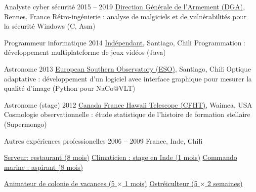 \begin{joblist}[12.8][8.4][4]

\setlength{\parskip}{0.3cm}
\vspace{-0.4cm}

\item[Analyste cyber sécurité]{2015 -- 2019}
	{
  \href{http://www.defense.gouv.fr/dga/}{Direction Générale de l'Armement (DGA)}, Rennes, France
  }
  {Rétro-ingénierie : analyse de malgiciels et de vulnérabilités pour la sécurité Windows (C, Asm)}

\item[Programmeur informatique]{2014}
	{
	\href{https://tinmarino.github.io/page/}{Indépendant}, Santiago, Chili
  }
  {Programmation : développement multiplateforme de jeux vidéos (Java)}



\item[Astronome]{2013}
	{
	\href{http://www.eso.org/public/}{European Southern Observatory (ESO)}, Santiago, Chili
	}
  {Optique adaptative : développement d'un logiciel avec interface graphique pour mesurer la qualité d'image (Python pour NaCo@VLT)}

\item[Astronome (stage)]{2012}
	{
\href{https://www.cfht.hawaii.edu/}{Canada France Hawaii Telescope (CFHT)}, Waimea, USA
  }
  {Cosmologie observationnelle : étude statistique de l'histoire de formation stellaire (Supermongo)}

\item[Autres expériences professionelles]{2006 -- 2009}
	{
	France, Inde, Chili
	}
	{
    \renewcommand\labelitemi{{}}
		\vspace{-0.8cm}
    \setlength{\parskip}{0cm}
		\begin{itemize}
		\setlength\itemsep{0cm}
    \cvitem \href{http://www.insertcoin.cl/}{ Serveur: restaurant (8 mois)}
    \cvitem \href{http://www.dupont.co.in/}{ Climaticien : stage en Inde (1 mois)}
    \cvitem \href{http://www.defense.gouv.fr/marine/organisation/forces/fusiliers-marins-et-commandos/force-maritime-des-fusiliers-marins-et-commandos}{ Commando marine : aspirant (8 mois)}

    \cvitem \href{http://www.vacances-pour-tous.org/}{ Animateur de colonie de vacances (5 $\times$ 1 mois)}
    \cvitem \href{http://huitresdesaintvaast.fr/}{ Ostréiculteur (5 $\times$ 2 semaines)}
		\end{itemize}
  }
\end{joblist}



